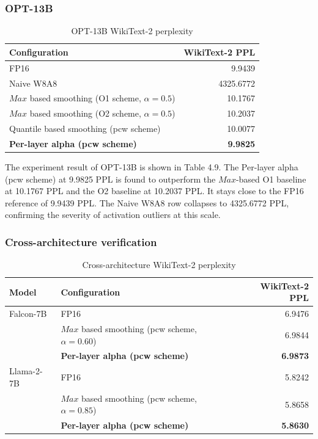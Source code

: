 \subsubsection*{OPT-13B}

\begin{table}[h]
\centering
\begin{threeparttable}
\caption{OPT-13B WikiText-2 perplexity}
\begin{tabular}{lr}
\hline
Configuration & WikiText-2 PPL \\
\hline
FP16 & 9.9439 \\
Naive W8A8 & 4325.6772 \\
$Max$ based smoothing (O1 scheme, $\alpha=0.5$) & 10.1767 \\
$Max$ based smoothing (O2 scheme, $\alpha=0.5$) & 10.2037 \\
Quantile based smoothing (pcw scheme) & 10.0077 \\
\textbf{Per-layer alpha (pcw scheme)} & \textbf{9.9825} \\
\hline
\end{tabular}
\end{threeparttable}
\end{table}

The experiment result of OPT-13B is shown in Table 4.9. The Per-layer alpha (pcw scheme) at 9.9825 PPL is found to outperform the $Max$-based O1 baseline at 10.1767 PPL and the O2 baseline at 10.2037 PPL. It stays close to the FP16 reference of 9.9439 PPL. The Naive W8A8 row collapses to 4325.6772 PPL, confirming the severity of activation outliers at this scale.


\subsubsection*{Cross-architecture verification}

\begin{table}[h]
\centering
\begin{threeparttable}
\caption{Cross-architecture WikiText-2 perplexity}
\begin{tabular}{llr}
\hline
Model & Configuration & WikiText-2 PPL \\
\hline
Falcon-7B & FP16 & 6.9476 \\
 & $Max$ based smoothing (pcw scheme, $\alpha=0.60$) & 6.9844 \\
 & \textbf{Per-layer alpha (pcw scheme)} & \textbf{6.9873} \\
\hline
Llama-2-7B & FP16 & 5.8242 \\
 & $Max$ based smoothing (pcw scheme, $\alpha=0.85$) & 5.8658 \\
 & \textbf{Per-layer alpha (pcw scheme)} & \textbf{5.8630} \\
\hline
\end{tabular}
\end{threeparttable}
\end{table}

